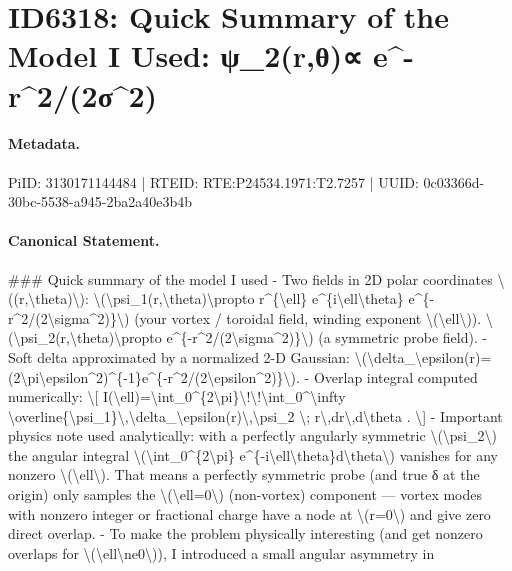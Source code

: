 \section*{ID6318: Quick Summary of the Model I Used: ψ\_2(r,θ)∝ e\textasciicircum{}-r\textasciicircum{}2/(2σ\textasciicircum{}2)}
\paragraph{Metadata.}
PiID: 3130171144484 | RTEID: RTE:P24534.1971:T2.7257 | UUID: 0c03366d-30bc-5538-a945-2ba2a40e3b4b

\paragraph{Canonical Statement.}
\#\#\# Quick summary of the model I used - Two fields in 2D polar coordinates \textbackslash{}((r,\textbackslash{}theta)\textbackslash{}): \textbackslash{}(\textbackslash{}psi\_1(r,\textbackslash{}theta)\textbackslash{}propto r\textasciicircum{}\{\textbackslash{}ell\} e\textasciicircum{}\{i\textbackslash{}ell\textbackslash{}theta\} e\textasciicircum{}\{-r\textasciicircum{}2/(2\textbackslash{}sigma\textasciicircum{}2)\}\textbackslash{}) (your vortex / toroidal field, winding exponent \textbackslash{}(\textbackslash{}ell\textbackslash{})). \textbackslash{}(\textbackslash{}psi\_2(r,\textbackslash{}theta)\textbackslash{}propto e\textasciicircum{}\{-r\textasciicircum{}2/(2\textbackslash{}sigma\textasciicircum{}2)\}\textbackslash{}) (a symmetric probe field). - Soft delta approximated by a normalized 2-D Gaussian: \textbackslash{}(\textbackslash{}delta\_\textbackslash{}epsilon(r)=(2\textbackslash{}pi\textbackslash{}epsilon\textasciicircum{}2)\textasciicircum{}\{-1\}e\textasciicircum{}\{-r\textasciicircum{}2/(2\textbackslash{}epsilon\textasciicircum{}2)\}\textbackslash{}). - Overlap integral computed numerically: \textbackslash{}[ I(\textbackslash{}ell)=\textbackslash{}int\_0\textasciicircum{}\{2\textbackslash{}pi\}\textbackslash{}!\textbackslash{}!\textbackslash{}int\_0\textasciicircum{}\textbackslash{}infty \textbackslash{}overline\{\textbackslash{}psi\_1\}\textbackslash{},\textbackslash{}delta\_\textbackslash{}epsilon(r)\textbackslash{},\textbackslash{}psi\_2 \textbackslash{}; r\textbackslash{},dr\textbackslash{},d\textbackslash{}theta . \textbackslash{}] - Important physics note used analytically: with a perfectly angularly symmetric \textbackslash{}(\textbackslash{}psi\_2\textbackslash{}) the angular integral \textbackslash{}(\textbackslash{}int\_0\textasciicircum{}\{2\textbackslash{}pi\} e\textasciicircum{}\{-i\textbackslash{}ell\textbackslash{}theta\}d\textbackslash{}theta\textbackslash{}) vanishes for any nonzero \textbackslash{}(\textbackslash{}ell\textbackslash{}). That means a perfectly symmetric probe (and true δ at the origin) only samples the \textbackslash{}(\textbackslash{}ell=0\textbackslash{}) (non-vortex) component — vortex modes with nonzero integer or fractional charge have a node at \textbackslash{}(r=0\textbackslash{}) and give zero direct overlap. - To make the problem physically interesting (and get nonzero overlaps for \textbackslash{}(\textbackslash{}ell\textbackslash{}ne0\textbackslash{})), I introduced a small angular asymmetry in 